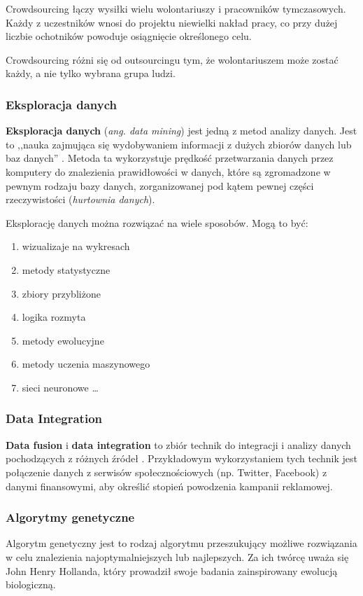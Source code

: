 Crowdsourcing łączy wysiłki wielu wolontariuszy i pracowników tymczasowych. Każdy z uczestników wnosi do projektu niewielki nakład pracy, co przy dużej liczbie ochotników powoduje osiągnięcie określonego celu.

Crowdsourcing różni się od outsourcingu tym, że wolontariuszem może zostać każdy, a nie tylko wybrana grupa ludzi.

\subsubsection{Eksploracja danych}
\label{sub:eksploracja_danych}
\textbf{Eksploracja danych} (\textit{ang. data mining}) jest jedną z metod analizy danych. Jest to ,,nauka zajmująca się wydobywaniem informacji z dużych zbiorów danych lub baz danych'' \cite{Hand01}. Metoda ta wykorzystuje prędkość przetwarzania danych przez komputery do znalezienia prawidłowości w danych, które są zgromadzone w pewnym rodzaju bazy danych, zorganizowanej pod kątem pewnej części rzeczywistości (\textit{hurtownia danych}). 

Eksplorację danych można rozwiązać na wiele sposobów. Mogą to być:
\begin{enumerate}
    \item wizualizaje na wykresach
    \item metody statystyczne
    \item zbiory przybliżone
    \item logika rozmyta
    \item metody ewolucyjne
    \item metody uczenia maszynowego
    \item sieci neuronowe \ldots
\end{enumerate}

\subsubsection{Data Integration}
\label{sub:data_integration}
\textbf{Data fusion} i \textbf{data integration} to zbiór technik do integracji i analizy danych pochodzących z różnych źródeł \cite{lenzerini02}. Przykładowym wykorzystaniem tych technik jest połączenie danych z serwisów społecznościowych (np. Twitter, Facebook) z danymi finansowymi, aby określić stopień powodzenia kampanii reklamowej.

\subsubsection{Algorytmy genetyczne}
\label{sub:algorytmy_genetyczne}
Algorytm genetyczny jest to rodzaj algorytmu przeszukujący możliwe rozwiązania w celu znalezienia najoptymalniejszych lub najlepszych. Za ich twórcę uważa się John Henry Hollanda, który prowadził swoje badania zainspirowany ewolucją biologiczną.

